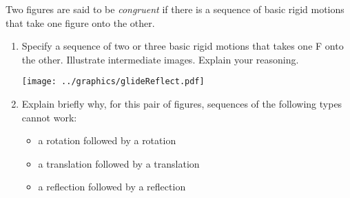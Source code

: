 \documentclass{ximera}
\begin{document}
\newpage
\begin{problem}
Two figures are said to be \emph{congruent} if there is a sequence of basic rigid motions that take one figure onto the other.  
\begin{enumerate}
\item Specify a sequence of two or three basic rigid motions that takes one F onto the other.  Illustrate intermediate images.  Explain your reasoning.  
\vspace{1in}
\begin{image}
\texttt{[image: ../graphics/glideReflect.pdf]}
\end{image}
\vspace{0.5in}
\item Explain briefly why, for this pair of figures, sequences of the following types cannot work: 
\begin{itemize}
\item a rotation followed by a rotation
\item a translation followed by a translation
\item a reflection followed by a reflection
\end{itemize}
\end{enumerate}
\end{problem}
\end{document}
